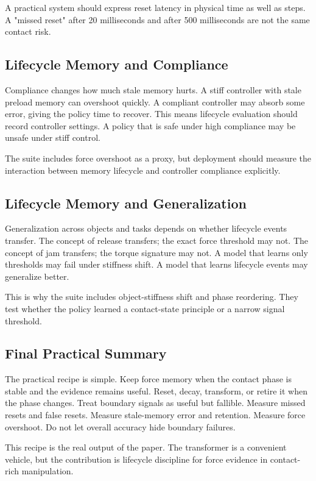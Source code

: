 \documentclass{article}
\begin{document}
A practical system should express reset latency in physical time as well as
steps. A "missed reset" after 20 milliseconds and after 500 milliseconds are
not the same contact risk.

\subsection{Lifecycle Memory and Compliance}

Compliance changes how much stale memory hurts. A stiff controller with stale
preload memory can overshoot quickly. A compliant controller may absorb some
error, giving the policy time to recover. This means lifecycle evaluation should
record controller settings. A policy that is safe under high compliance may be
unsafe under stiff control.

The suite includes force overshoot as a proxy, but deployment should measure
the interaction between memory lifecycle and controller compliance explicitly.

\subsection{Lifecycle Memory and Generalization}

Generalization across objects and tasks depends on whether lifecycle events
transfer. The concept of release transfers; the exact force threshold may not.
The concept of jam transfers; the torque signature may not. A model that learns
only thresholds may fail under stiffness shift. A model that learns lifecycle
events may generalize better.

This is why the suite includes object-stiffness shift and phase reordering.
They test whether the policy learned a contact-state principle or a narrow
signal threshold.

\subsection{Final Practical Summary}

The practical recipe is simple. Keep force memory when the contact phase is
stable and the evidence remains useful. Reset, decay, transform, or retire it
when the phase changes. Treat boundary signals as useful but fallible. Measure
missed resets and false resets. Measure stale-memory error and retention.
Measure force overshoot. Do not let overall accuracy hide boundary failures.

This recipe is the real output of the paper. The transformer is a convenient
vehicle, but the contribution is lifecycle discipline for force evidence in
contact-rich manipulation.
\end{document}
